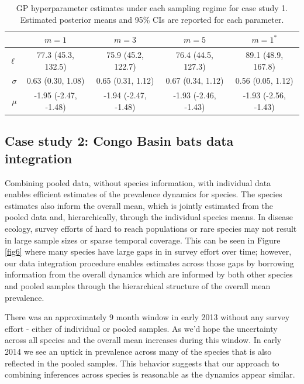 \documentclass{article}
\begin{document}
\begin{table} [h]
\caption{GP hyperparameter estimates under each sampling regime for case study 1. Estimated posterior means and 95\% CIs are reported for each parameter.} \centering
\begin{tabular}{ r | c   c   c   c  } \toprule
        & $m=1$ & $m=3$ & $m=5$ &  $m=1^*$\\
\midrule
$\ell$ & 77.3 (45.3, 132.5) & 75.9 (45.2, 122.7)  & 76.4 (44.5, 127.3) & 89.1 (48.9, 167.8)  \\
$\sigma$ & 0.63 (0.30, 1.08) & 0.65 (0.31, 1.12) & 0.67 (0.34, 1.12)  & 0.56  (0.05, 1.12) \\
$\mu$ & -1.95 (-2.47, -1.48) & -1.94  (-2.47,  -1.48) & -1.93 (-2.46,  -1.43) & -1.93 (-2.56,  -1.43) \\
\bottomrule 
\end{tabular}
\label{t3}
\end{table}



\subsection{Case study 2: Congo Basin bats data integration}

Combining pooled data, without species information, with individual data enables efficient estimates of the prevalence dynamics for species. The species estimates also inform the overall mean, which is jointly estimated from the pooled data and, hierarchically, through the individual species means. In disease ecology, survey efforts of hard to reach populations or rare species may not result in large sample sizes or sparse temporal coverage. This can be seen in Figure \ref{fig6} where many species have large gaps in in survey effort over time; however, our data integration procedure enables estimates across those gaps by borrowing information from the overall dynamics which are informed by both other species and pooled samples through the hierarchical structure of the overall mean prevalence.

There was an approximately 9 month window in early 2013 without any survey effort - either of individual or pooled samples. As we'd hope the uncertainty across all species and the overall mean increases during this window. In early 2014 we see an uptick in prevalence across many of the species that is also reflected in the pooled samples. This behavior suggests that our approach to combining inferences across species is reasonable as the dynamics appear similar.
\end{document}
